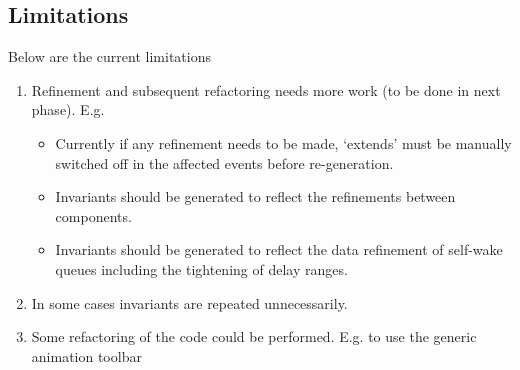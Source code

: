 \subsection{Limitations} Below are the current limitations
\begin{enumerate}
\item Refinement and subsequent refactoring needs more work (to be done in next phase). E.g. 
  \begin{itemize}
  \item Currently if any refinement needs to be made, `extends' must be manually switched off in the affected events before re-generation.	\item Invariants should be generated to reflect the refinements between components.	\item Invariants should be generated to reflect the data refinement of self-wake queues including the tightening of delay ranges.
  \end{itemize}\item In some cases invariants are repeated unnecessarily.\item Some refactoring of the code could be performed. E.g. to use the generic animation toolbar
\end{enumerate}

